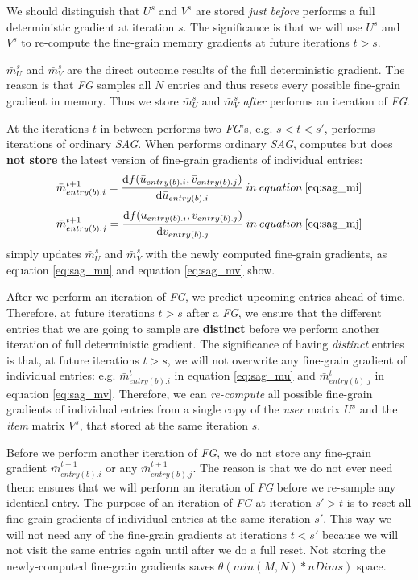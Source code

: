 We should distinguish that $U^{s}$ and $V^{s}$ are stored \emph{just before} \tool performs a full deterministic gradient at iteration $s$.
The significance is that we will use $U^{s}$ and $V^{s}$ to re-compute the fine-grain memory gradients at future iterations $t > s$.

$\bar{m}_{U}^{s}$ and $\bar{m}_{V}^{s}$ are the direct outcome results of the full deterministic gradient.  
The reason is that \emph{FG} samples all $N$ entries and thus resets every possible fine-grain gradient in memory.
Thus we store $\bar{m}_{U}^{s}$ and $\bar{m}_{V}^{s}$ \emph{after} \tool performs an iteration of \emph{FG}.

At the iterations $t$ in between \tool performs two \emph{FG}'s, e.g. $s < t < s'$, \tool performs iterations of ordinary \emph{SAG}.
When \tool performs ordinary \emph{SAG}, \tool computes but does \textbf{not store} the latest version of fine-grain gradients of individual entries: 
\[
\bar{m}_{entry(b).i}^{t+1} = \frac{\text{d}f(\bar{u}_{entry(b).i}, \bar{v}_{entry(b).j})}{\text{d}\bar{u}_{entry(b).i}}\:in\:equation\:\ref{eq:sag_mi}
\]
\[
\bar{m}_{entry(b).j}^{t+1} = \frac{\text{d}f(\bar{u}_{entry(b).i}, \bar{v}_{entry(b).j})}{\text{d}\bar{v}_{entry(b).j}}\:in\:equation\:\ref{eq:sag_mj}
\]
\tool simply updates $\bar{m}_{U}^{s}$ and $\bar{m}_{V}^{s}$ with the newly computed fine-grain gradients, as equation \ref{eq:sag_mu} and equation \ref{eq:sag_mv} show.

After we perform an iteration of \emph{FG}, we predict upcoming entries ahead of time.
Therefore, at future iterations $t > s$ after a \emph{FG}, we ensure that the different entries that we are going to sample are \textbf{distinct} before we perform another iteration of full deterministic gradient.
The significance of having \emph{distinct} entries is that, at future iterations $t > s$, we will not overwrite any fine-grain gradient of individual entries:
e.g. $\bar{m}_{entry(b).i}^{t}$ in equation \ref{eq:sag_mu} and $\bar{m}_{entry(b).j}^{t}$ in equation \ref{eq:sag_mv}.
Therefore, we can \emph{re-compute} all possible fine-grain gradients of individual entries 
from a single copy of the \emph{user} matrix $U^{s}$ and the \emph{item} matrix $V^{s}$, 
that \tool stored at the same iteration $s$.

Before we perform another iteration of \emph{FG}, we do not store any fine-grain gradient $\bar{m}_{entry(b).i}^{t+1}$ or any $\bar{m}_{entry(b).j}^{t+1}$.
The reason is that we do not ever need them: \tool ensures that we will perform an iteration of \emph{FG} before we re-sample any identical entry. 
The purpose of an iteration of \emph{FG} at iteration $s' > t$ is to reset all fine-grain gradients of individual entries at the same iteration $s'$.
This way we will not need any of the fine-grain gradients at iterations $t < s'$ because we will not visit the same entries again until after we do a full reset.
Not storing the newly-computed fine-grain gradients saves $\theta(min(M,N)*nDims)$ space.


